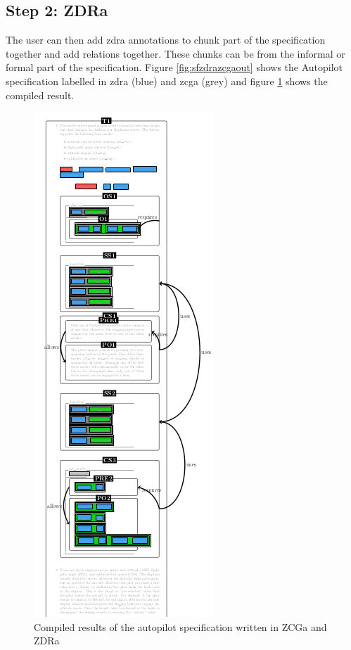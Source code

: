  \subsection{Step 2: ZDRa}

 The user can then add \gls{zdra} annotations to chunk part of the specification
together and add relations together. These chunks can be from the informal or
formal part of the specification. Figure \ref{fig:sfzdrazcgaout} shows the Autopilot
specification labelled in \gls{zdra} (blue) and \gls{zcga} (grey) and figure
\ref{fig:sfcompzcgazdra} shows the compiled result.

\begin{figure}[H]
\centering
\includegraphics[scale=0.6]{Figures/fullexample/sfzdracorrectout.png}
\caption{Compiled results of the autopilot specification written in ZCGa and ZDRa \label{fig:sfcompzcgazdra}}
\end{figure}

